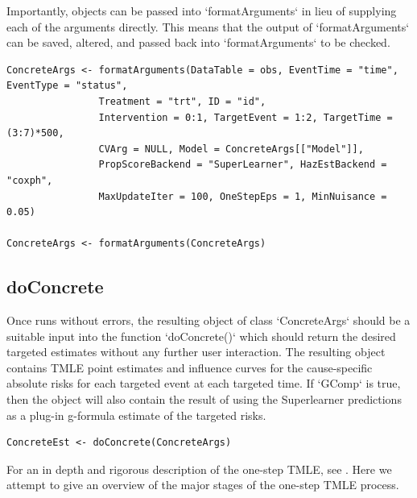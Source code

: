\documentclass{report}
\newcommand{\1}{\ensuremath{\mathbf{1}}}
\begin{document}
\begin{enumerate}
Importantly,  objects can be passed into `formatArguments` in lieu of supplying each of the arguments directly. This means that the output of `formatArguments` can be saved, altered, and passed back into `formatArguments` to be checked.

\begin{lstlisting}
ConcreteArgs <- formatArguments(DataTable = obs, EventTime = "time", EventType = "status", 
				Treatment = "trt", ID = "id", 
				Intervention = 0:1, TargetEvent = 1:2, TargetTime = (3:7)*500, 
				CVArg = NULL, Model = ConcreteArgs[["Model"]], 
				PropScoreBackend = "SuperLearner", HazEstBackend = "coxph", 
				MaxUpdateIter = 100, OneStepEps = 1, MinNuisance = 0.05)

ConcreteArgs <- formatArguments(ConcreteArgs)
\end{lstlisting}
\end{enumerate}


\subsection{doConcrete}
\label{doConcrete}
Once  runs without errors, the resulting object of class `ConcreteArgs` should be a suitable input into the function `doConcrete()` which should return the desired targeted estimates without any further user interaction. The resulting object contains TMLE point estimates and influence curves for the cause-specific absolute risks for each targeted event at each targeted time. If `GComp` is true, then the object will also contain the result of using the Superlearner predictions as a plug-in g-formula estimate of the targeted risks.

\begin{lstlisting}
ConcreteEst <- doConcrete(ConcreteArgs)
\end{lstlisting}

For an in depth and rigorous description of the one-step TMLE, see \cite{rytgaard2021one}. Here we attempt to give an overview of the major stages of the one-step TMLE process.
\end{document}
